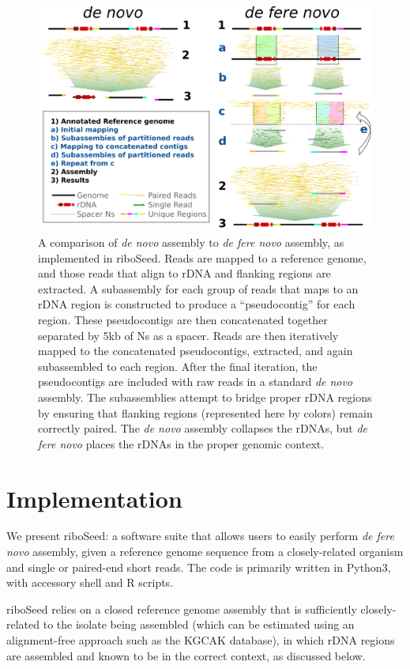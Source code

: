 \documentclass[10pt]{article}
\begin{document}
\begin{linenumbers}
\begin{figure}[!h]
  \centering
  \includegraphics[width=.8\textwidth]{riboSeed_v13}
  \caption{A comparison of \textit{de novo} assembly to \textit{de fere novo} assembly, as implemented in riboSeed. Reads are mapped to a reference genome, and those reads that align to rDNA and flanking regions are extracted. A subassembly for each group of reads that maps to an rDNA region is constructed to produce a ``pseudocontig'' for each region. These pseudocontigs are then concatenated together separated by 5kb of Ns as a spacer. Reads are then iteratively mapped to the concatenated pseudocontigs, extracted, and again subassembled to each region. After the final iteration, the pseudocontigs are included with raw reads in a standard \textit{de novo} assembly. The subassemblies attempt to bridge proper rDNA regions by ensuring that flanking regions (represented here by colors) remain correctly paired. The \textit{de novo} assembly collapses the rDNAs, but \textit{de fere novo} places the rDNAs in the proper genomic context.
  }
  \label{fig:overview}
\end{figure}




\section*{Implementation}
We present riboSeed: a software suite that allows users to easily perform \textit{de fere novo} assembly, given a reference genome sequence from a closely-related organism and single or paired-end short reads. The code is primarily written in Python3, with accessory shell and R scripts.


riboSeed relies on a closed reference genome assembly that is sufficiently closely-related to the isolate being assembled (which can be estimated using an alignment-free approach such as the KGCAK database\cite{Wang2015b}), in which rDNA regions are assembled and known to be in the correct context, as discussed below.


\end{linenumbers}
\end{document}
